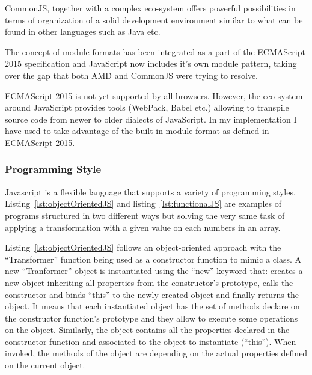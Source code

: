 CommonJS, together with a complex eco-system offers powerful possibilities in terms of organization of a solid development environment similar to what can be found in other languages such as Java etc.

The concept of module formats has been integrated as a part of the ECMAScript 2015 specification and JavaScript now includes it's own module pattern, taking over the gap that both AMD and CommonJS were trying to resolve.

ECMAScript 2015 is not yet supported by all browsers. However, the eco-system around JavaScript provides tools (WebPack, Babel etc.) allowing to transpile source code from newer to older dialects of JavaScript. In my implementation I have used to take advantage of the built-in module format as defined in ECMAScript 2015.

\subsubsection{Programming Style}

Javascript is a flexible language that supports a variety of programming styles. Listing~\ref{lst:objectOrientedJS} and listing~\ref{lst:functionalJS} are examples of programs structured in two different ways but solving the very same task of applying a transformation with a given value on each numbers in an array. 






Listing~\ref{lst:objectOrientedJS} follows an object-oriented approach with the ``Transformer'' function being used as a constructor function to mimic a class. A new ``Tranformer'' object is instantiated using the ``new'' keyword that: creates a new object inheriting all properties from the constructor's prototype, calls the constructor and binds ``this'' to the newly created object and finally returns the object. It means that each instantiated object has the set of methods declare on the constructor function's prototype and they allow to execute some operations on the object. Similarly, the object contains all the properties declared in the constructor function and associated to the object to instantiate (``this''). When invoked, the methods of the object are depending on the actual properties defined on the current object.

